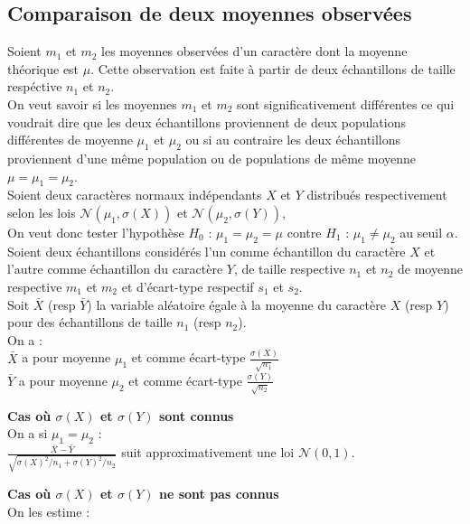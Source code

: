 \documentclass[a4paper,11pt]{book}
\begin{document}
\subsection{Comparaison de deux moyennes observ\'ees }\label{sec:compm}
Soient $m_1$ et $m_2$ les moyennes observ\'ees d'un caract\`ere
dont la moyenne th\'eorique est $\mu$. Cette observation est faite \`a partir
 de deux \'echantillons de taille resp\'ective $n_1$ et $n_2$.\\
On veut savoir si les moyennes $m_1$ et $m_2$ sont significativement 
diff\'erentes ce qui voudrait dire que les deux \'echantillons proviennent de 
deux populations diff\'erentes de moyenne $\mu_1$ et $\mu_2$ ou si au
contraire les deux \'echantillons proviennent d'une m\^eme population  ou
de populations de m\^eme moyenne $\mu=\mu_1=\mu_2$.\\
Soient deux caract\`eres normaux ind\'ependants $X$ et $Y$ distribu\'es 
respectivement selon les lois $\mathcal N(\mu_1,\sigma(X))$ et 
$\mathcal N(\mu_2,\sigma(Y))$,\\
On veut donc tester l'hypoth\`ese $H_0$ : $\mu_1=\mu_2=\mu$ contre 
$H_1$ : $\mu_1\neq \mu_2$ au seuil $\alpha$.\\
Soient deux \'echantillons consid\'er\'es l'un comme \'echantillon du 
caract\`ere $X$ et l'autre comme \'echantillon du caract\`ere $Y$,
de taille respective $n_1$ et $n_2$ de moyenne respective $m_1$ et $m_2$ et 
d'\'ecart-type respectif $s_1$ et $s_2$.\\
 Soit $\bar X$ (resp $\bar Y$) la variable al\'eatoire \'egale \`a la moyenne 
du caract\`ere $X$ (resp $Y$) pour des \'echantillons de taille $n_1$ 
(resp $n_2$).\\
On a :\\
$\bar X$ a pour moyenne $\mu_1$ et comme \'ecart-type $\frac{\sigma(X)}{\sqrt{n_1}}$\\
$\bar Y$ a pour moyenne $\mu_2$ et comme \'ecart-type $\frac{\sigma(Y)}{\sqrt{n_2}}$

{\bf Cas o\`u  $\sigma(X)$ et $\sigma(Y)$ sont connus}\\
On a si $\mu_1=\mu_2$ :\\
$\frac{\bar X-\bar Y}{\sqrt{\sigma(X)^2/n_1+\sigma(Y)^2/n_2}}$ suit 
approximativement une loi $\mathcal N(0,1)$.

{\bf Cas o\`u $\sigma(X)$ et $\sigma(Y)$ ne sont pas connus}\\
On les estime :
\end{document}
